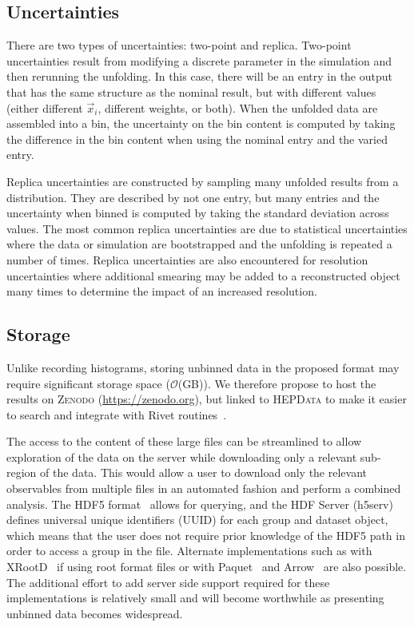\documentclass[a4paper,11pt]{article}
\begin{document}
 \subsection{Uncertainties}
 \label{sec:uncerts}
 
 There are two types of uncertainties: two-point and replica.  Two-point uncertainties result from modifying a discrete parameter in the simulation and then rerunning the unfolding.  In this case, there will be an entry in the output that has the same structure as the nominal result, but with different values (either different $\vec{x}_i$, different weights, or both).  When the unfolded data are assembled into a bin, the uncertainty on the bin content is computed by taking the difference in the bin content when using the nominal entry and the varied entry.  
 
 Replica uncertainties are constructed by sampling many unfolded results from a distribution.  They are described by not one entry, but many entries and the uncertainty when binned is computed by taking the standard deviation across values.  The most common replica uncertainties are due to statistical uncertainties where the data or simulation are bootstrapped and the unfolding is repeated a number of times.  Replica uncertainties are also encountered for resolution uncertainties where additional smearing may be added to a reconstructed object many times to determine the impact of an increased resolution.
 
\subsection{Storage}
 
Unlike recording histograms, storing unbinned data in the proposed format may require significant storage space ($\mathcal{O}$(GB)).  We therefore propose to host the results on \textsc{Zenodo} (\url{https://zenodo.org}), but linked to \textsc{HEPData} to make it easier to search and integrate with Rivet routines~\cite{Buckley:2010ar}.

The access to the content of these large files can be streamlined to allow exploration of the data on the server while downloading only a relevant sub-region of the data. This would allow a user to download only the relevant observables from multiple files in an automated fashion and perform a combined analysis. The HDF5 format~\cite{hdf5} allows for querying, and the HDF Server (h5serv)~\cite{h5serv} defines universal unique identifiers (UUID) for each group and dataset object, which means that the user does not require prior knowledge of the HDF5 path in order to access a group in the file. Alternate implementations such as with XRootD~\cite{xrootd} if using root format files or with Paquet~\cite{parquet} and Arrow~\cite{arrow} are also possible. The additional effort to add server side support required for these implementations is relatively small and will become worthwhile as presenting unbinned data becomes widespread.
\end{document}
